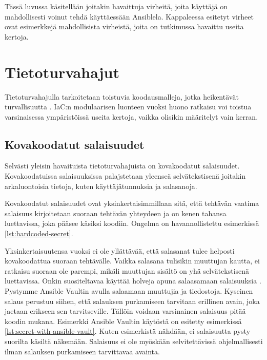 Tässä luvussa käsitellään joitakin havaittuja virheitä, joita käyttäjä on mahdollisesti
voinut tehdä käyttäessään Ansiblela. Kappaleessa esitetyt virheet ovat esimerkkejä
mahdollisista virheistä, joita on tutkimussa \parencite{RahmanAkond2021SSiA,
    RahmanAkond2019TSSS, KumaraIndika2021Tdad} havaittu useita kertoja.

\section{Tietoturvahajut}

Tietoturvahajulla tarkoitetaan toistuvia koodausmalleja, jotka heikentävät turvallisuutta
\parencite{RahmanAkond2021SSiA}. IaC:n modulaarisen luonteen vuoksi huono ratkaisu voi
toistua varsinaisessa ympäristöissä useita kertoja, vaikka olisikin määritelyt vain
kerran.

\subsection{Kovakoodatut salaisuudet}

Selvästi yleisin havaituista tietoturvahajuista on kovakoodatut salaisuudet. Kovakoodatuissa
salaisuuksissa palajstetaan yleenseä selvätekstisenä joitakin arkaluontoisia tietoja, kuten
käyttäjätunnuksia ja salasanoja. \parencite{RahmanAkond2019TSSS}

Kovakoodatut salaisuudet ovat yksinkertaisimmillaan sitä, että tehtävän vaatima salaisuus
kirjoitetaan suoraan tehtävän yhteydeen ja on kenen tahansa luettavissa, joka pääsee käsiksi
koodiin. Ongelma on havannollistettu esimerkissä  \ref{lst:hardcoded-secret}.



Yksinkertaisuutensa vuoksi ei ole yllättävää, että salasanat tulee helposti kovakoodattua
suoraan tehtävälle. Vaikka salasana tulisikin muuttujan kautta, ei ratkaisu suoraan ole
parempi, mikäli muuttujan sisältö on yhä selvätekstisenä luettavissa. Onkin suositeltavaa
käyttää holveja apuna salaasamaan salaisuuksia \parencite{RahmanAkond2019TSSS}. Pystymme
Ansible Vaultin avulla salaamaan muuttujia ja tiedostoja. Kyseinen salaus perustuu siihen,
että salauksen purkamiseen tarvitaan erillinen avain, joka jaetaan erikseen sen tarvitseville.
Tällöin voidaan varsinainen salaisuus pitää koodin mukana. Esimerkki Ansible Vaultin käytöstä
on esitetty esimerkissä \ref{lst:secret-with-ansible-vault}. Kuten esimerkistä nähdään,
ei salaisuutta pysty suorilta käsiltä näkemään. Salaisuus ei ole myöskään selvitettävissä
ohjelmallisesti ilman salauksen purkamiseen tarvittavaa avainta.

